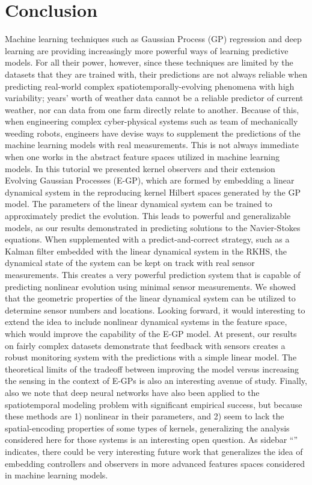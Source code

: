\section{Conclusion}\label{sec:conclusion}
Machine learning techniques such as Gaussian Process (GP) regression and deep learning are providing increasingly more powerful ways of learning predictive models. For all their power, however, since these techniques are limited by the datasets that they are trained with, their predictions are not always reliable when predicting real-world complex spatiotemporally-evolving phenomena with high variability; years' worth of weather data cannot be a reliable predictor of current weather, nor can data from one farm directly relate to another. Because of this, when engineering complex cyber-physical systems such as team of mechanically weeding robots, engineers have devise ways to supplement the predictions of the machine learning models with real measurements. This is not always immediate when one works in the abstract feature spaces utilized in machine learning models. In this tutorial we presented kernel observers and their extension Evolving Gaussian Processes (E-GP), which are formed by embedding a linear dynamical system in the reproducing kernel Hilbert spaces generated by the GP model. The parameters of the linear dynamical system can be trained to approximately predict the evolution. This leads to powerful and generalizable models, as our results demonstrated in predicting solutions to the Navier-Stokes equations. When supplemented with a predict-and-correct strategy, such as a Kalman filter embedded with the linear dynamical system in the RKHS, the dynamical state of the system can be kept on track with real sensor measurements. This creates a very powerful prediction system that is capable of predicting nonlinear evolution using minimal sensor measurements. We showed that the geometric properties of the linear dynamical system can be utilized to determine sensor numbers and locations. Looking forward, it would interesting to extend the idea to include nonlinear dynamical systems in the feature space, which would improve the capability of the E-GP model. At present, our results on fairly complex datasets demonstrate that feedback with sensors creates a robust monitoring system with the predictions with a simple linear model. The theoretical limits of the tradeoff between improving the model versus increasing the sensing in the context of E-GPs is also an interesting avenue of study. Finally, also we note that deep neural networks have also been applied to the spatiotemporal modeling problem with significant empirical success\cite{tran2015learning}, but because these methods are 1) nonlinear in their parameters, and 2) seem to lack the spatial-encoding properties of some types of kernels, generalizing the analysis considered here for those systems is an interesting open question. As sidebar ``'' indicates, there could be very interesting future work that generalizes the idea of embedding controllers and observers in more advanced features spaces considered in machine learning models. 
